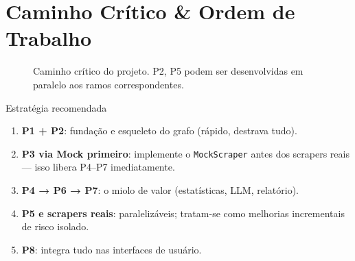\documentclass[12pt, a4paper]{article}
\begin{document}
\section{Caminho Crítico \& Ordem de Trabalho}

\begin{figure}[H]
  \centering
  \caption{Caminho crítico do projeto. P2, P5 podem ser desenvolvidas em
  paralelo aos ramos correspondentes.}
  \label{fig:critico}
\end{figure}

\begin{conceito}{Estratégia recomendada}
\begin{enumerate}
  \item \textbf{P1 + P2}: fundação e esqueleto do grafo (rápido, destrava tudo).
  \item \textbf{P3 via Mock primeiro}: implemente o \texttt{MockScraper} antes
        dos scrapers reais — isso libera P4–P7 imediatamente.
  \item \textbf{P4 → P6 → P7}: o miolo de valor (estatísticas, LLM, relatório).
  \item \textbf{P5 e scrapers reais}: paralelizáveis; tratam-se como melhorias
        incrementais de risco isolado.
  \item \textbf{P8}: integra tudo nas interfaces de usuário.
\end{enumerate}
\end{conceito}
\end{document}
